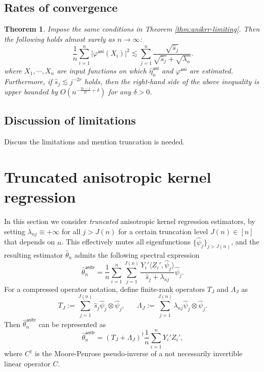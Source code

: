 \documentclass[11pt,a4paper]{article}
\renewcommand{\hat}{\widehat}
\theoremstyle{definition}
\theoremstyle{plain}
\newtheorem{theorem}{Theorem}[section]
\theoremstyle{remark}
\newcommand{\ani}{\mathsf{ani}}
\newcommand{\anitr}{\mathsf{anitr}}
\begin{document}
\subsection{Rates of convergence}

\begin{theorem}
Impose the same conditions in Theorem \ref{thm:anikrr-limiting}. Then the following holds almost surely as $n\to\infty$:
$$
\frac{1}{n}\sum_{i=1}^n \big|\varphi^\ani(X_i)\big|^2 \lesssim \sum_{j=1}^n \frac{\sqrt{\hat s_j}}{\sqrt{\hat s_j}+\sqrt{\lambda_n}}.
$$
where $X_1,\cdots,X_n$ are input functions on which $\hat\eta_n^\ani$ and $\varphi^\ani$ are estimated.
Furthermore, if $\hat s_j\lesssim j^{-2r}$ holds, then the right-hand side of the above inequality is upper bounded by $O(n^{-\frac{2r-1}{2r}+\delta})$
for any $\delta>0$.
\label{thm:anikrr-rates}
\end{theorem}

\subsection{Discussion of limitations}

{\color{red} Discuss the limitations and mention truncation is needed.}

\section{Truncated anisotropic kernel regression}\label{sec:anitr}

In this section we consider \emph{truncated} anisotropic kernel regression estimators, by setting $\lambda_{nj}\equiv +\infty$
for all $j> J(n)$ for a certain truncation level $J(n)\in[n]$ that depends on $n$.
This effectively mutes all eigenfunctions $\{\hat\psi_j\}_{j>J(n)}$, and the resulting estimator $\hat\theta_n$ admits the following spectral expression
\begin{equation}
\hat\theta_n^\anitr = \frac{1}{n}\sum_{i=1}^n\sum_{j=1}^{J(n)}\frac{Y_i'\langle Z_i',\hat\psi_j\rangle}{\hat s_j+\lambda_{nj}}\hat\psi_j.
\label{eq:anitr}
\end{equation}
For a compressed operator notation, define finite-rank operators $T_J$ and $\Lambda_J$ as
$$
T_J := \sum_{j=1}^{J(n)}\hat s_j\hat\psi_j\otimes\hat\psi_j,\;\;\;\;\;\; \Lambda_J := \sum_{j=1}^{J(n)}\lambda_{nj}\hat\psi_j\otimes\hat\psi_j.
$$
Then $\hat\theta_n^\anitr$ can be represented as
$$
\hat\theta_n^\anitr = (T_J+\Lambda_J)^{\dagger}\frac{1}{n}\sum_{i=1}^n Y_i'Z_i',
$$
where $C^\dagger$ is the Moore-Penrose pseudo-inverse of a not necessarily invertible linear operator $C$.
\end{document}
